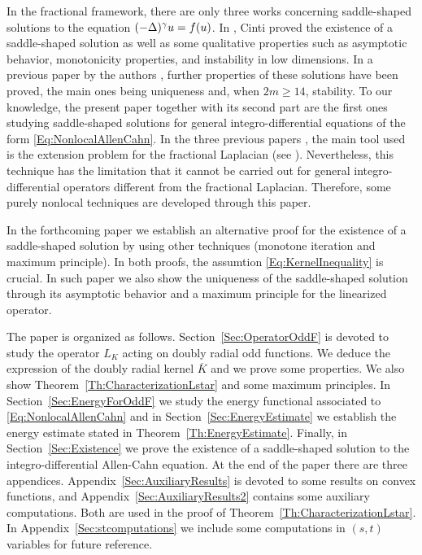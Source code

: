 In the fractional framework, there are only three works concerning saddle-shaped solutions to the equation $(-\Delta)^\gamma u = f(u)$. In  \cite{Cinti-Saddle,Cinti-Saddle2}, Cinti proved the existence of a saddle-shaped solution as well as some qualitative properties such as asymptotic behavior, monotonicity properties, and instability in low dimensions. In a previous paper by the authors \cite{Felipe-Sanz-Perela:SaddleFractional}, further properties of these solutions have been proved, the main ones being uniqueness and, when $2m\geq 14$, stability. To our knowledge, the present paper together with its second part \cite{FelipeSanz-Perela:IntegroDifferentialII} are the first ones studying saddle-shaped solutions for general integro-differential equations of the form \eqref{Eq:NonlocalAllenCahn}. In the three previous papers \cite{Cinti-Saddle, Cinti-Saddle2, Felipe-Sanz-Perela:SaddleFractional}, the main tool used is the extension problem for the fractional Laplacian (see \cite{CaffarelliSilvestre}). Nevertheless, this technique has the limitation that it cannot be carried out for general integro-differential operators different from the fractional Laplacian. Therefore, some purely nonlocal techniques are developed through this paper.

In the forthcoming paper \cite{FelipeSanz-Perela:IntegroDifferentialII} we establish an alternative proof for the existence of a saddle-shaped solution by using other techniques (monotone iteration and maximum principle). In both proofs, the assumtion \eqref{Eq:KernelInequality} is crucial. In such paper we also show the uniqueness of the saddle-shaped solution through its asymptotic behavior and a maximum principle for the linearized operator.

The paper is organized as follows. Section~\ref{Sec:OperatorOddF} is devoted to study the operator $L_K$ acting on doubly radial odd functions. We deduce the expression of the doubly radial kernel $\overline{K}$ and we prove some properties. We also show Theorem~\ref{Th:CharacterizationLstar} and some maximum principles. In Section~\ref{Sec:EnergyForOddF} we study the energy functional associated to \eqref{Eq:NonlocalAllenCahn} and in Section~\ref{Sec:EnergyEstimate} we establish the energy estimate stated in Theorem~\ref{Th:EnergyEstimate}. Finally, in Section~\ref{Sec:Existence} we prove the existence of a saddle-shaped solution to the integro-differential Allen-Cahn equation. At the end of the paper there are three appendices. Appendix~\ref{Sec:AuxiliaryResults} is devoted to some results on convex functions, and Appendix~\ref{Sec:AuxiliaryResults2} contains some auxiliary computations. Both are used in the proof of Theorem~\ref{Th:CharacterizationLstar}. In Appendix~\ref{Sec:stcomputations} we include some computations in $(s,t)$ variables for future reference.